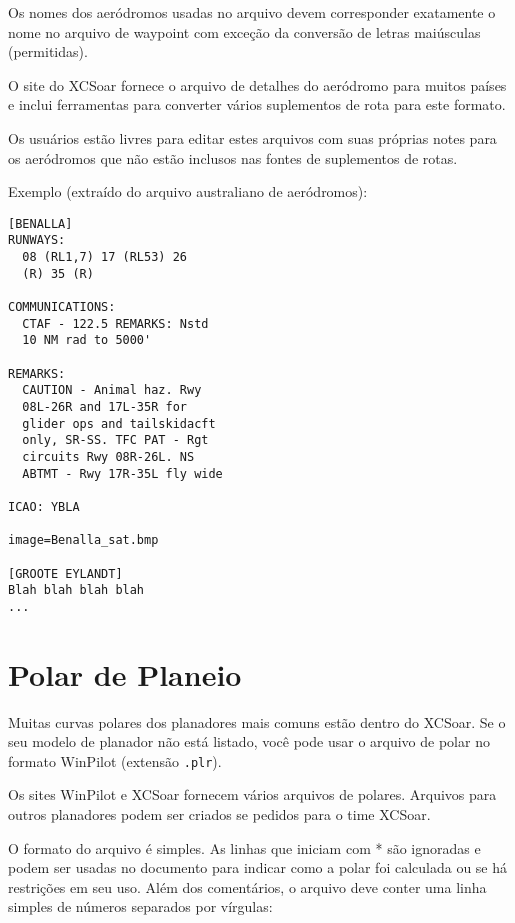 Os nomes dos aeródromos usadas no arquivo devem corresponder exatamente o nome no arquivo de waypoint com exceção da conversão de letras maiúsculas (permitidas).

O site do XCSoar fornece o arquivo de detalhes do aeródromo para muitos países e inclui ferramentas para converter vários suplementos de rota para este formato.

Os usuários estão livres para editar estes arquivos com suas próprias notes para os aeródromos que não estão inclusos nas fontes de suplementos de rotas.

Exemplo (extraído do arquivo australiano de aeródromos):

\begin{verbatim}
[BENALLA]
RUNWAYS:
  08 (RL1,7) 17 (RL53) 26
  (R) 35 (R)

COMMUNICATIONS:
  CTAF - 122.5 REMARKS: Nstd
  10 NM rad to 5000'

REMARKS:
  CAUTION - Animal haz. Rwy
  08L-26R and 17L-35R for
  glider ops and tailskidacft
  only, SR-SS. TFC PAT - Rgt
  circuits Rwy 08R-26L. NS
  ABTMT - Rwy 17R-35L fly wide

ICAO: YBLA

image=Benalla_sat.bmp

[GROOTE EYLANDT]
Blah blah blah blah
...
\end{verbatim}

\section{Polar de Planeio} \label{sec:glide-polar}

Muitas curvas polares dos planadores mais comuns estão dentro do XCSoar.  Se o seu modelo de planador não está listado, você pode usar o arquivo de polar no formato WinPilot (extensão  \verb|.plr|).

Os sites WinPilot e XCSoar fornecem vários arquivos de polares.  Arquivos para outros planadores podem ser criados se pedidos para o time XCSoar.

O formato do arquivo é simples.  As linhas que iniciam com * são ignoradas e podem ser usadas no documento para indicar como a polar foi calculada ou se há restrições em seu uso.  Além dos comentários, o arquivo deve conter uma linha simples de números separados por vírgulas:

